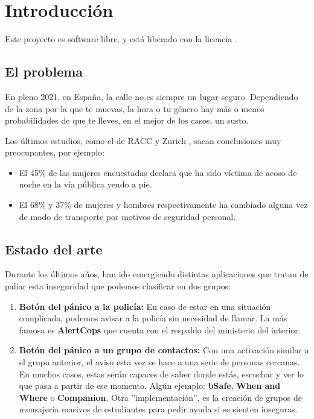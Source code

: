 \chapter{Introducción}

Este proyecto es software libre, y está liberado con la licencia \cite{gplv3}.

\section{El problema}
En pleno 2021, en España, la calle no es siempre un lugar seguro. Dependiendo de la zona por la que te muevas, la hora o tu género
hay más o menos probabilidades de que te lleves, en el mejor de los casos, un susto.

Los últimos estudios, como el de RACC y Zurich \cite{racc-zurich}, sacan conclusiones muy preocupantes, por ejemplo: 
\begin{itemize}
  \item El 45\% de las mujeres encuestadas declara que ha sido víctima de acoso de noche en la vía pública yendo a pie.
  \item El 68\% y 37\% de mujeres y hombres respectivamente ha cambiado alguna vez de modo de transporte por motivos de seguridad personal.
\end{itemize}

\section{Estado del arte}\label{sec:art}
Durante los últimos años, han ido emergiendo distintas aplicaciones que tratan de paliar esta inseguridad que podemos clasificar en dos grupos:
\begin{enumerate}
\item \textbf{Botón del pánico a la policía:} En caso de estar en una situación complicada, podemos avisar a la policía sin necesidad de llamar. La más famosa es \textbf{AlertCops} que cuenta con el respaldo del ministerio del interior.
\item \textbf{Botón del pánico a un grupo de contactos:} Con una activación similar a el grupo anterior, el aviso esta vez se hace a una serie de personas cercanas. En muchos casos, estas serán capaces de saber donde estás, escuchar y ver lo que pasa a partir de ese momento. Algún ejemplo: \textbf{bSafe}, \textbf{When and Where} o \textbf{Companion}.
Otra ''implementación'', es la creación de grupos de mensajería masivos de estudiantes para pedir ayuda si se sienten inseguras.
\end{enumerate}

